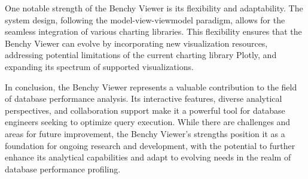 One notable strength of the Benchy Viewer is its flexibility and adaptability. The system design, following the model-view-viewmodel paradigm, allows for the seamless integration of various charting libraries. This flexibility ensures that the Benchy Viewer can evolve by incorporating new visualization resources, addressing potential limitations of the current charting library Plotly, and expanding its spectrum of supported visualizations.

In conclusion, the Benchy Viewer represents a valuable contribution to the field of database performance analysis. Its interactive features, diverse analytical perspectives, and collaboration support make it a powerful tool for database engineers seeking to optimize query execution. While there are challenges and areas for future improvement, the Benchy Viewer's strengths position it as a foundation for ongoing research and development, with the potential to further enhance its analytical capabilities and adapt to evolving needs in the realm of database performance profiling.

